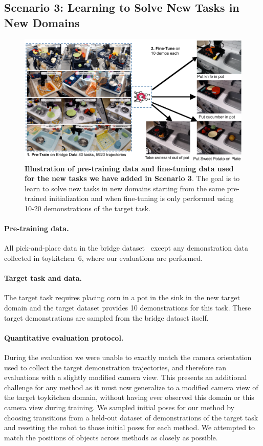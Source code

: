 \documentclass[../thesis.tex]{subfiles}
\begin{document}
\subsection{Scenario 3: Learning to Solve New Tasks in New Domains}

\begin{figure}
\centering
  \includegraphics[width=0.83\linewidth]{chapters/ptr/scenario3_overview.pdf}
  \caption{\footnotesize {\textbf{Illustration of pre-training data and fine-tuning data used for the new tasks we have added in Scenario 3}. The goal is to learn to solve new tasks in new domains starting from the same pre-trained initialization and when fine-tuning is only performed using 10-20 demonstrations of the target task.}}
  \label{fig:scenario4_overview}
\end{figure}

\paragraph{Pre-training data.} All pick-and-place data in the bridge dataset~\citep{ebert2021bridge} except any demonstration data collected in toykitchen~6, where our evaluations are performed.

\paragraph{Target task and data.} The target task requires placing corn in a pot in the sink in the new target domain and the target dataset provides 10 demonstrations for this task. These target demonstrations are sampled from the bridge dataset itself.

\paragraph{Quantitative evaluation protocol.} During the evaluation we were unable to exactly match the camera orientation used to collect the target demonstration trajectories, and therefore ran evaluations with a slightly modified camera view. This presents an additional challenge for any method as it must now generalize to a modified camera view of the target toykitchen domain, without having ever observed this domain or this camera view during training. We sampled initial poses for our method by choosing transitions from a held-out dataset of demonstrations of the target task and resetting the robot to those initial poses for each method. We attempted to match the positions of objects across methods as closely as possible.
\end{document}
